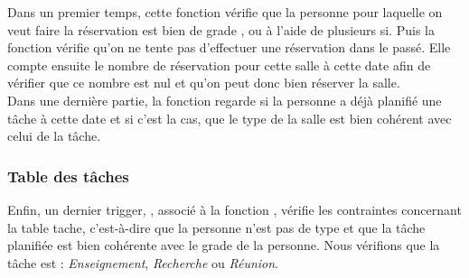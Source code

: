 	Dans un premier temps, cette fonction vérifie que la personne pour laquelle on veut faire la réservation est bien de grade ,  ou  à l'aide de plusieurs si. Puis la fonction vérifie qu'on ne tente pas d'effectuer une réservation dans le passé. Elle compte ensuite le nombre de réservation pour cette salle à cette date afin de vérifier que ce nombre est nul et qu'on peut donc bien réserver la salle.\\

	Dans une dernière partie, la fonction regarde si la personne a déjà planifié une tâche à cette date et si c'est la cas, que le type de la salle est bien cohérent avec celui de la tâche.

\subsubsection{Table des tâches}
	Enfin, un dernier trigger, , associé à la fonction , vérifie les contraintes concernant la table tache, c'est-à-dire que la personne n'est pas de type  et que la tâche planifiée est bien cohérente avec le grade de la personne. Nous vérifions que la tâche est : \textit{Enseignement}, \textit{Recherche} ou \textit{Réunion}.
